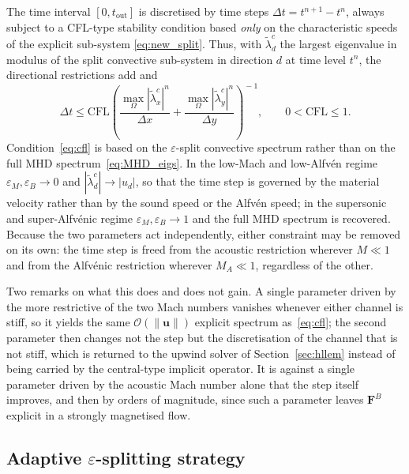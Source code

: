 \documentclass[a4paper,fleqn]{cas-sc}
\theoremstyle{remark}
\newcommand{\eps}{\varepsilon}
\newcommand{\epsM}{\eps_{M}}
\newcommand{\epsB}{\eps_{B}}
\newcommand{\FF}{\mathbf{F}}
\begin{document}
The time interval $[0,t_{\mathrm{out}}]$ is discretised by time steps
$\Delta t=t^{n+1}-t^{n}$, always subject to a CFL-type stability condition based
\emph{only} on the characteristic speeds of the explicit sub-system
\eqref{eq:new_split}. Thus, with $\tilde\lambda^{c}_{d}$ the largest eigenvalue
in modulus of the split convective sub-system in direction $d$ at time level
$t^{n}$, the directional restrictions add and
\begin{equation}
\label{eq:cfl}
\Delta t\le \mathrm{CFL}\left(
\frac{\max_\Omega|\tilde\lambda^{c}_{x}|^{n}}{\Delta x}
+\frac{\max_\Omega|\tilde\lambda^{c}_{y}|^{n}}{\Delta y}\right)^{\!-1},
\qquad 0<\mathrm{CFL}\le1 .
\end{equation}
Condition~\eqref{eq:cfl} is based on the $\eps$-split convective spectrum rather
than on the full MHD spectrum~\eqref{eq:MHD_eigs}. In the low-Mach and low-Alfv\'en
regime $\epsM,\epsB\to0$ and $|\tilde\lambda^{c}_{d}|\to|u_{d}|$, so that the
time step is governed by the material velocity rather than by the sound speed or
the Alfv\'en speed; in the supersonic and super-Alfv\'enic regime
$\epsM,\epsB\to1$ and the full MHD spectrum is recovered. Because the two
parameters act independently, either constraint may be removed on its own: the
time step is freed from the acoustic restriction wherever $M\ll1$ and from the
Alfv\'enic restriction wherever $M_A\ll1$, regardless of the other.

Two remarks on what this does and does not gain. A single parameter driven by the
more restrictive of the two Mach numbers vanishes whenever either channel is
stiff, so it yields the same $\mathcal O(\|\mathbf u\|)$ explicit spectrum
as~\eqref{eq:cfl}; the second parameter then changes not the step but the
discretisation of the channel that is not stiff, which is returned to the upwind
solver of Section~\ref{sec:hllem} instead of being carried by the central-type
implicit operator. It is against a single parameter driven by the acoustic Mach
number alone that the step itself improves, and then by orders of magnitude,
since such a parameter leaves $\FF^{B}$ explicit in a strongly magnetised flow.

\subsection{Adaptive $\eps$-splitting strategy}
\label{sec:eps_strategy}
\end{document}
